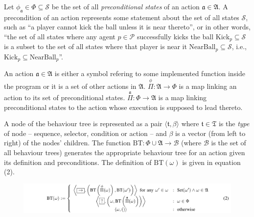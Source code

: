 Let \(\phi_\mathfrak{a}\in\Phi\subseteq\mathcal{S}\) be the set of all \textit{preconditional states} of an action \(\mathfrak{a}\in\mathfrak{A}\). A precondition of an action represents some statement about the set of all states \(\mathcal{S}\), such as ``a player cannot kick the ball unless it is near thereto'', or in other words, ``the set of all states where any agent \(p\in\mathcal{P}\) successfully kicks the ball \(\text{Kick}_p \subseteq \mathcal{S}\) is a subset to the set of all states where that player is near it \(\text{NearBall}_p \subseteq \mathcal{S}\), i.e., \(\text{Kick}_p \subseteq \text{NearBall}_p\)''.

An action \(\mathfrak{a}\in\mathfrak{A}\) is either a symbol refering to some implemented function inside the program or it is a set of other actions in \(\mathfrak{A}\). \(\overset{\phi}\Pi : \mathfrak{A} \to \Phi\) is a map linking an action to its set of preconditional states. \(\overset{\mathfrak{a}}\Pi : \Phi \to \mathfrak{A}\) is a map linking preconditional states to the action whose execution is supposed to lead thereto.

A node of the behaviour tree is represented as a pair \(\langle \mathfrak{t}, \beta \rangle\) where \(\mathfrak{t}\in\mathfrak{T}\) is the \textit{type} of node -- sequence, selector, condition or action -- and \(\beta\) is a vector (from left to right) of the nodes' children. The function \(\text{BT}:\Phi\cup\mathfrak{A} \to \mathscr{B}\) (where \(\mathscr{B}\) is the set of all behaviour trees) generates the appropriate behaviour tree for an action given its definition and preconditions. The definition of \(\text{BT}(\omega)\) is given in equation (2).

\begin{figure}[h!]
	\centering
    \includegraphics[width=\textwidth]{equation2.png}
    \label{fig:fullbredd}
\end{figure}

